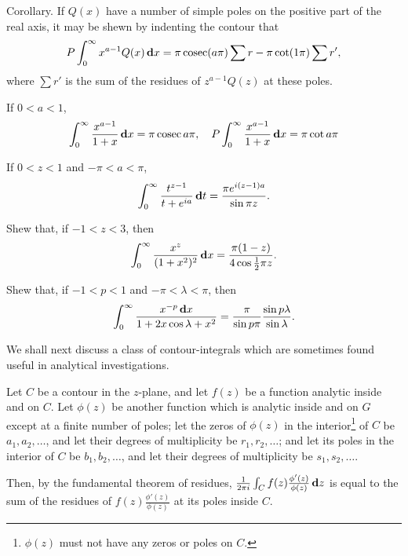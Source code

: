 Corollary. If $Q(x)$ have a number of simple poles on the positive
part of the real axis, it may be shewn by indenting the contour that
$$
P \int_{0}^{\infty} x^{a-1} Q(x) \, \mathbf{d} x
=
\pi \operatorname{cosec} (a\pi) \sum r
-
\pi \cot (1\pi) \sum r',
$$
where $\sum r'$ is the sum of the residues of $z^{a-1} Q(z)$ at these poles.
\begin{wandwexample}
If $0 < a < 1$,
$$
\int_{0}^{\infty} \frac{x^{a-1}}{1+x} \, \mathbf{d} x
=
\pi \operatorname{cosec} a\pi,
\quad
P \int_{0}^{\infty} \frac{x^{a-1}}{1+x} \, \mathbf{d} x
=
\pi \cot a\pi
$$
\end{wandwexample}
%
%
\begin{wandwexample}
  If $0 < z < 1$ and $-\pi < a < \pi$,
  $$
  \int_{0}^{\infty} \frac{t^{z-1}}{ t+e^{ia} } \, \mathbf{d} t
  =
  \frac{ \pi e^{i(z-1)a}}{\sin \pi z}.
  $$
\end{wandwexample}
\begin{wandwexample}
  Shew that, if $- 1 < z < 3$, then
  $$
  \int_{0}^{\infty} \frac{ x^{z} }{ (1+x^{2})^{2} } \, \mathbf{d} x
  =
  \frac{ \pi (1-z) }{ 4 \cos \frac{1}{2}\pi z}.
  $$
\end{wandwexample}
\begin{wandwexample}
  Shew that, if $-1 < p < 1$ and $-\pi < \lambda < \pi$, then
  $$
  \int_{0}^{\infty}
  \frac{ x^{-p} \, \mathbf{d} x }{ 1 + 2x \cos\lambda + x^{2} }
  =
  \frac{\pi}{\sin p\pi} \frac{\sin p\lambda}{\sin \lambda}.
  $$
\end{wandwexample}
We shall next discuss a class of contour-integrals which are
sometimes found useful in analytical investigations.

Let $C$ be a contour in the $z$-plane, and let $f(z)$ be a function
analytic inside and on $C$. Let $\phi(z)$ be another function which is
analytic inside and on $G$ except at a finite number of poles; let the
zeros of $\phi(z)$ in the interior\footnote{$\phi(z)$ must not have
  any zeros or poles on $C$.} of $C$ be $a_{1},a_{2},\ldots$, and let
their degrees of multiplicity be $r_{1},r_{2},\ldots$; and let its
poles in the interior of $C$ be $b_{1},b_{2},\ldots$, and let their
degrees of multiplicity be $s_{1},s_{2},\ldots$.

Then, by the fundamental theorem of residues,
$ \frac{1}{2\pi i} \int_{C} f(z) \frac{\phi'(z)}{\phi(z)} \, \mathbf{d} z $
is equal to the sum of the residues of
$f(z) \frac{\phi'(z)}{\phi(z)}$
at its poles inside $C$.

